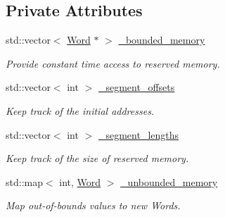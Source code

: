 \subsection*{Private Attributes}
\begin{DoxyCompactItemize}
\item 
\hypertarget{classMemory_a6391f325c42a93f4c56f0c44e6b35fda}{
std::vector$<$ \hyperlink{classWord}{Word} $\ast$ $>$ \hyperlink{classMemory_a6391f325c42a93f4c56f0c44e6b35fda}{\_\-bounded\_\-memory}}
\label{classMemory_a6391f325c42a93f4c56f0c44e6b35fda}

\begin{DoxyCompactList}\small\item\em Provide constant time access to reserved memory. \item\end{DoxyCompactList}\item 
\hypertarget{classMemory_a29d6fa2f1774f0c770130c968820d008}{
std::vector$<$ int $>$ \hyperlink{classMemory_a29d6fa2f1774f0c770130c968820d008}{\_\-segment\_\-offsets}}
\label{classMemory_a29d6fa2f1774f0c770130c968820d008}

\begin{DoxyCompactList}\small\item\em Keep track of the initial addresses. \item\end{DoxyCompactList}\item 
\hypertarget{classMemory_a3e5675ae2bc551a9c5429525e2dce857}{
std::vector$<$ int $>$ \hyperlink{classMemory_a3e5675ae2bc551a9c5429525e2dce857}{\_\-segment\_\-lengths}}
\label{classMemory_a3e5675ae2bc551a9c5429525e2dce857}

\begin{DoxyCompactList}\small\item\em Keep track of the size of reserved memory. \item\end{DoxyCompactList}\item 
\hypertarget{classMemory_a36f459f042295fb06b4d7ec9b397f952}{
std::map$<$ int, \hyperlink{classWord}{Word} $>$ \hyperlink{classMemory_a36f459f042295fb06b4d7ec9b397f952}{\_\-unbounded\_\-memory}}
\label{classMemory_a36f459f042295fb06b4d7ec9b397f952}

\begin{DoxyCompactList}\small\item\em Map out-\/of-\/bounds values to new Words. \item\end{DoxyCompactList}\end{DoxyCompactItemize}


